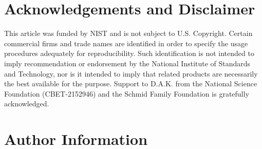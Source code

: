 \documentclass[
  9pt,
  bestpractices,
]{livecoms}
\begin{document}
\section{\label{sec:ack}Acknowledgements and Disclaimer}

This article was funded by NIST and is not subject to U.S. Copyright.
Certain commercial firms and trade names are identified in order to specify the usage procedures adequately for reproducibility.
Such identification is not intended to imply recommendation or endorsement by the National Institute of Standards and Technology, nor is it intended to imply that related products are necessarily the best available for the purpose.
Support to D.A.K. from the National Science Foundation (CBET-2152946) and the Schmid Family Foundation is gratefully acknowledged.

\section*{Author Information}
\makeorcid

\nocite{*}

\end{document}
